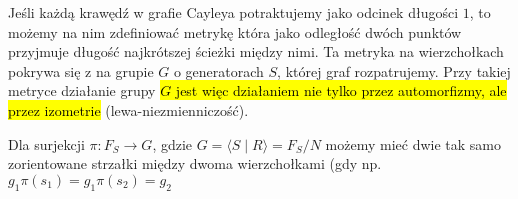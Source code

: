 Jeśli każdą krawędź w grafie Cayleya potraktujemy jako odcinek długości $1$, to możemy na nim zdefiniować metrykę która jako odległość dwóch punktów przyjmuje długość najkrótszej ścieżki między nimi. Ta metryka na wierzchołkach pokrywa się z  na grupie $G$ o generatorach $S$, której graf rozpatrujemy. Przy takiej metryce działanie grupy \hl{$G$ jest więc działaniem nie tylko przez automorfizmy, ale przez izometrie} (lewa-niezmienniczość).


Dla surjekcji $\pi:F_S\to G$, gdzie $G=\langle S\;|\; R\rangle=F_S/N$ możemy mieć dwie tak samo zorientowane strzałki między dwoma wierzchołkami (gdy np. $g_1\pi(s_1)=g_1\pi(s_2)=g_2$
\begin{center}
\end{center}


